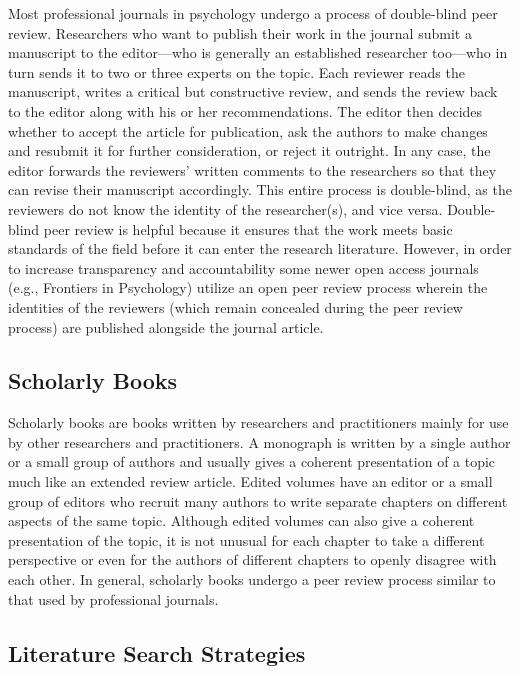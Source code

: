 Most professional journals in psychology undergo a process of double-blind peer review. Researchers who want to publish their work in the journal submit a manuscript to the editor---who is generally an established researcher too---who in turn sends it to two or three experts on the topic. Each reviewer reads the manuscript, writes a critical but constructive review, and sends the review back to the editor along with his or her recommendations. The editor then decides whether to accept the article for publication, ask the authors to make changes and resubmit it for further consideration, or reject it outright. In any case, the editor forwards the reviewers' written comments to the researchers so that they can revise their manuscript accordingly. This entire process is double-blind, as the reviewers do not know the identity of the researcher(s), and vice versa. Double-blind peer review is helpful because it ensures that the work meets basic standards of the field before it can enter the research literature. However, in order to increase transparency and accountability some newer open access journals (e.g., Frontiers in Psychology) utilize an open peer review process wherein the identities of the reviewers (which remain concealed during the peer review process) are published alongside the journal article.

\subsection{Scholarly Books}
Scholarly books are books written by researchers and practitioners mainly for use by other researchers and practitioners. A monograph is written by a single author or a small group of authors and usually gives a coherent presentation of a topic much like an extended review article. Edited volumes have an editor or a small group of editors who recruit many authors to write separate chapters on different aspects of the same topic. Although edited volumes can also give a coherent presentation of the topic, it is not unusual for each chapter to take a different perspective or even for the authors of different chapters to openly disagree with each other. In general, scholarly books undergo a peer review process similar to that used by professional journals.

\subsection{Literature Search Strategies}
